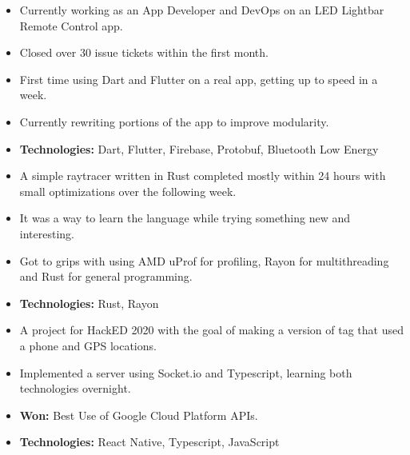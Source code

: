 \documentclass[10pt,a4paper,ragged2e,academicons]{altacv}
\begin{document}


\makecvheader


\begin{paracol}{2}


  \begin{itemize}
    \item Currently working as an App Developer and DevOps on an LED Lightbar Remote Control app.
    \item Closed over 30 issue tickets within the first month.
    \item First time using Dart and Flutter on a real app, getting up to speed in a week.
    \item Currently rewriting portions of the app to improve modularity.
    \item \textbf{Technologies:} Dart, Flutter, Firebase, Protobuf, Bluetooth Low Energy
  \end{itemize}
  \divider\small

  \begin{itemize}
    \item A simple raytracer written in Rust completed mostly within 24 hours with small optimizations over the following week.
    \item It was a way to learn the language while trying something new and interesting.
    \item Got to grips with using AMD uProf for profiling, Rayon for multithreading and Rust for general programming.
    \item \textbf{Technologies:} Rust, Rayon
  \end{itemize}
  \divider\small

  \begin{itemize}
    \item A project for HackED 2020 with the goal of making a version of tag that used a phone and GPS locations.
    \item Implemented a server using Socket.io and Typescript, learning both technologies overnight.
    \item \textbf{Won:} Best Use of Google Cloud Platform APIs.
    \item \textbf{Technologies:} React Native, Typescript, JavaScript
  \end{itemize}
  \divider\small


\end{paracol}
\end{document}
